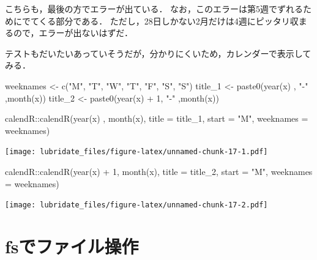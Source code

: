 \documentclass[
]{article}
\newenvironment{Shaded}{\begin{snugshade}}{\end{snugshade}}
\newcommand{\AttributeTok}[1]{\textcolor[rgb]{0.77,0.63,0.00}{#1}}
\newcommand{\DecValTok}[1]{\textcolor[rgb]{0.00,0.00,0.81}{#1}}
\newcommand{\FunctionTok}[1]{\textcolor[rgb]{0.00,0.00,0.00}{#1}}
\newcommand{\NormalTok}[1]{#1}
\newcommand{\OtherTok}[1]{\textcolor[rgb]{0.56,0.35,0.01}{#1}}
\newcommand{\SpecialCharTok}[1]{\textcolor[rgb]{0.00,0.00,0.00}{#1}}
\newcommand{\StringTok}[1]{\textcolor[rgb]{0.31,0.60,0.02}{#1}}
\begin{document}
こちらも，最後の方でエラーが出ている．
なお，このエラーは第5週でずれるためにでてくる部分である．
ただし，28日しかない2月だけは4週にピッタリ収まるので，エラーが出ないはずだ．

テストもだいたいあっていそうだが，分かりにくいため，カレンダーで表示してみる．

\begin{Shaded}
\begin{Highlighting}[]
\NormalTok{weeknames }\OtherTok{\textless{}{-}}  \FunctionTok{c}\NormalTok{(}\StringTok{"M"}\NormalTok{, }\StringTok{"T"}\NormalTok{, }\StringTok{"W"}\NormalTok{, }\StringTok{"T"}\NormalTok{, }\StringTok{"F"}\NormalTok{, }\StringTok{"S"}\NormalTok{, }\StringTok{"S"}\NormalTok{)}
\NormalTok{title\_1 }\OtherTok{\textless{}{-}} \FunctionTok{paste0}\NormalTok{(}\FunctionTok{year}\NormalTok{(x)    , }\StringTok{"{-}"}\NormalTok{ ,}\FunctionTok{month}\NormalTok{(x))}
\NormalTok{title\_2 }\OtherTok{\textless{}{-}} \FunctionTok{paste0}\NormalTok{(}\FunctionTok{year}\NormalTok{(x) }\SpecialCharTok{+} \DecValTok{1}\NormalTok{, }\StringTok{"{-}"}\NormalTok{ ,}\FunctionTok{month}\NormalTok{(x))}

\NormalTok{calendR}\SpecialCharTok{::}\FunctionTok{calendR}\NormalTok{(}\FunctionTok{year}\NormalTok{(x)    , }\FunctionTok{month}\NormalTok{(x), }\AttributeTok{title =}\NormalTok{ title\_1, }\AttributeTok{start =} \StringTok{"M"}\NormalTok{, }\AttributeTok{weeknames =}\NormalTok{ weeknames)}
\end{Highlighting}
\end{Shaded}

\texttt{[image: lubridate\_files/figure-latex/unnamed-chunk-17-1.pdf]}

\begin{Shaded}
\begin{Highlighting}[]
\NormalTok{calendR}\SpecialCharTok{::}\FunctionTok{calendR}\NormalTok{(}\FunctionTok{year}\NormalTok{(x) }\SpecialCharTok{+} \DecValTok{1}\NormalTok{, }\FunctionTok{month}\NormalTok{(x), }\AttributeTok{title =}\NormalTok{ title\_2, }\AttributeTok{start =} \StringTok{"M"}\NormalTok{, }\AttributeTok{weeknames =}\NormalTok{ weeknames)}
\end{Highlighting}
\end{Shaded}

\texttt{[image: lubridate\_files/figure-latex/unnamed-chunk-17-2.pdf]}

\hypertarget{fs}{%
\section{fsでファイル操作}\label{fs}}
\end{document}
